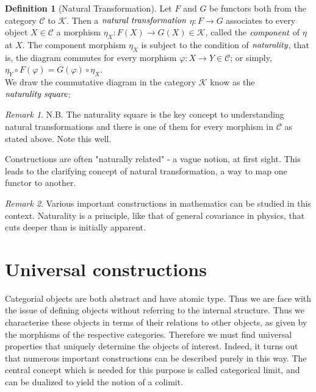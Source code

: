 \documentclass[10pt, oneside, reqno]{amsart}
\theoremstyle{plain}%
\theoremstyle{definition}
\newtheorem{defn}[thm]{Definition}
\theoremstyle{remark}
\newtheorem*{rem}{Remark}
\begin{document}
\begin{defn}[Natural Transformation]
 Let $F$ and $G$ be functors both from the category $\mathcal{C}$ to $\mathcal{K}$.
 Then a $\emph{natural transformation}$ $\eta : F \to G$ associates to every object
 $X \in \mathcal{C}$ a morphism $\eta_{X} : F(X) \to G(X) \in \mathcal{K}$, called the $\emph{component}$
 of $\eta$ at $X$. The component morphism $\eta_{X}$ is subject to the condition of $\emph{naturality}$,
 that is, the diagram commutes for every morphism $\varphi: X \to Y \in \mathcal{C}$; or simply,
 $\eta_{Y} \circ F(\varphi) = G(\varphi) \circ \eta_{X}$.
 \\
 We draw the commutative diagram in the category $\mathcal{K}$ know as the $\emph{naturality square}$:
\end{defn}
\begin{rem}
 N.B. The naturality square is the key concept to understanding natural transformations and
 there is one of them for every morphism in $\mathcal{C}$ as stated above. Note this well.
\end{rem}

Constructions are often "naturally related" - a vague notion, at first sight.
This leads to the clarifying concept of natural transformation, a way to map one functor to another.
\begin{rem}
 Various important constructions in mathematics can be studied in this context.
 Naturality is a principle, like that of general covariance in physics, that cuts deeper than is initially apparent.
\end{rem}


\section{Universal constructions} %
\label{sec:universalconstructions}
Categorial objects are both abstract and have atomic type.
Thus we are face with the issue of defining objects without referring to the internal structure.
Thus we characterise these objects in terms of their relations to other objects, as given by the morphisms 
of the respective categories. Therefore we must find universal properties that uniquely determine the objects of interest.
Indeed, it turns out that numerous important constructions can be described purely in this way.
The central concept which is needed for this purpose is called categorical limit, and can be dualized to yield the notion of a colimit.
\end{document}
